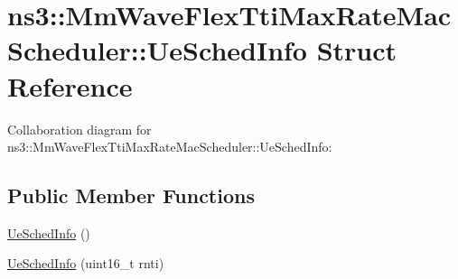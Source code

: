 \hypertarget{structns3_1_1MmWaveFlexTtiMaxRateMacScheduler_1_1UeSchedInfo}{}\section{ns3\+:\+:Mm\+Wave\+Flex\+Tti\+Max\+Rate\+Mac\+Scheduler\+:\+:Ue\+Sched\+Info Struct Reference}
\label{structns3_1_1MmWaveFlexTtiMaxRateMacScheduler_1_1UeSchedInfo}


Collaboration diagram for ns3\+:\+:Mm\+Wave\+Flex\+Tti\+Max\+Rate\+Mac\+Scheduler\+:\+:Ue\+Sched\+Info\+:
\subsection*{Public Member Functions}
\begin{DoxyCompactItemize}
\item 
\hyperlink{structns3_1_1MmWaveFlexTtiMaxRateMacScheduler_1_1UeSchedInfo_aeb271a907784892405e163da22d1afa0}{Ue\+Sched\+Info} ()
\item 
\hyperlink{structns3_1_1MmWaveFlexTtiMaxRateMacScheduler_1_1UeSchedInfo_aa28fa735231cfeda70e64415ceff1e80}{Ue\+Sched\+Info} (uint16\+\_\+t rnti)
\end{DoxyCompactItemize}

